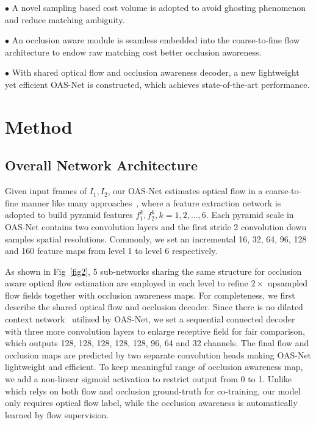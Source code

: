 \documentclass{article}
\begin{document}
$\bullet$ A novel sampling based cost volume is adopted to avoid ghosting phenomenon and reduce matching ambiguity.

$\bullet$ An occlusion aware module is seamless embedded into the coarse-to-fine flow architecture to endow raw matching cost better occlusion awareness.

$\bullet$ With shared optical flow and occlusion awareness decoder, a new lightweight yet efficient OAS-Net is constructed, which achieves state-of-the-art performance.


\section{Method}
\subsection{Overall Network Architecture}
Given input frames of $I_1, I_2$, our OAS-Net estimates optical flow in a coarse-to-fine manner like many approaches~\cite{Sun_2018_CVPR,Hui_2018_CVPR,Yin_2019_CVPR,Kong_2020}, where a feature extraction network is adopted to build pyramid features $f_1^{k}, f_2^{k}, k=1,2, \ldots, 6$. Each pyramid scale in OAS-Net contains two convolution layers and the first stride 2 convolution down samples spatial resolutions. Commonly, we set an incremental 16, 32, 64, 96, 128 and 160 feature maps from level 1 to level 6 respectively.

As shown in Fig~\ref{fig2}, 5 sub-networks sharing the same structure for occlusion aware optical flow estimation are employed in each level to refine $2\times$ upsampled flow fields together with occlusion awareness maps. For completeness, we first describe the shared optical flow and occlusion decoder. Since there is no dilated context network~\cite{Sun_2018_CVPR, Hur_2019_IRR} utilized by OAS-Net, we set a sequential connected decoder with three more convolution layers to enlarge receptive field for fair comparison, which outputs 128, 128, 128, 128, 128, 96, 64 and 32 channels. The final flow and occlusion maps are predicted by two separate convolution heads making OAS-Net lightweight and efficient. To keep meaningful range of occlusion awareness map, we add a non-linear sigmoid activation to restrict output from 0 to 1. Unlike~\cite{Hur_2019_IRR} which relys on both flow and occlusion ground-truth for co-training, our model only requires optical flow label, while the occlusion awareness is automatically learned by flow supervision.
\end{document}
